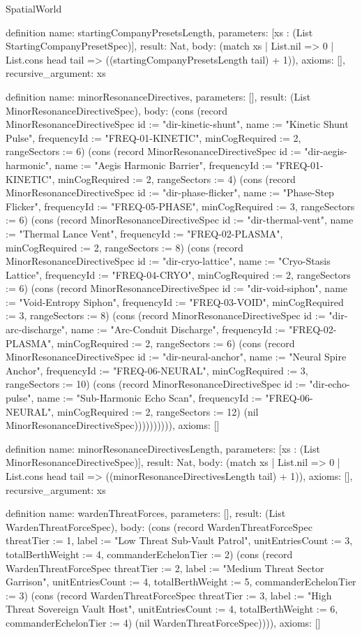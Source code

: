 \begin{lexlean}{SpatialWorld}
\begin{semanticmodule}
definition{
  name: startingCompanyPresetsLength,
  parameters: [xs : (List StartingCompanyPresetSpec)],
  result: Nat,
  body: (match xs
    | List.nil => 0
    | List.cons head tail => ((startingCompanyPresetsLength tail) + 1)),
  axioms: [],
  recursive_argument: xs
}

definition{
  name: minorResonanceDirectives,
  parameters: [],
  result: (List MinorResonanceDirectiveSpec),
  body: (cons (record MinorResonanceDirectiveSpec {id := "dir-kinetic-shunt", name := "Kinetic Shunt Pulse", frequencyId := "FREQ-01-KINETIC", minCogRequired := 2, rangeSectors := 6}) (cons (record MinorResonanceDirectiveSpec {id := "dir-aegis-harmonic", name := "Aegis Harmonic Barrier", frequencyId := "FREQ-01-KINETIC", minCogRequired := 2, rangeSectors := 4}) (cons (record MinorResonanceDirectiveSpec {id := "dir-phase-flicker", name := "Phase-Step Flicker", frequencyId := "FREQ-05-PHASE", minCogRequired := 3, rangeSectors := 6}) (cons (record MinorResonanceDirectiveSpec {id := "dir-thermal-vent", name := "Thermal Lance Vent", frequencyId := "FREQ-02-PLASMA", minCogRequired := 2, rangeSectors := 8}) (cons (record MinorResonanceDirectiveSpec {id := "dir-cryo-lattice", name := "Cryo-Stasis Lattice", frequencyId := "FREQ-04-CRYO", minCogRequired := 2, rangeSectors := 6}) (cons (record MinorResonanceDirectiveSpec {id := "dir-void-siphon", name := "Void-Entropy Siphon", frequencyId := "FREQ-03-VOID", minCogRequired := 3, rangeSectors := 8}) (cons (record MinorResonanceDirectiveSpec {id := "dir-arc-discharge", name := "Arc-Conduit Discharge", frequencyId := "FREQ-02-PLASMA", minCogRequired := 2, rangeSectors := 6}) (cons (record MinorResonanceDirectiveSpec {id := "dir-neural-anchor", name := "Neural Spire Anchor", frequencyId := "FREQ-06-NEURAL", minCogRequired := 3, rangeSectors := 10}) (cons (record MinorResonanceDirectiveSpec {id := "dir-echo-pulse", name := "Sub-Harmonic Echo Scan", frequencyId := "FREQ-06-NEURAL", minCogRequired := 2, rangeSectors := 12}) (nil MinorResonanceDirectiveSpec)))))))))),
  axioms: []
}

definition{
  name: minorResonanceDirectivesLength,
  parameters: [xs : (List MinorResonanceDirectiveSpec)],
  result: Nat,
  body: (match xs
    | List.nil => 0
    | List.cons head tail => ((minorResonanceDirectivesLength tail) + 1)),
  axioms: [],
  recursive_argument: xs
}

definition{
  name: wardenThreatForces,
  parameters: [],
  result: (List WardenThreatForceSpec),
  body: (cons (record WardenThreatForceSpec {threatTier := 1, label := "Low Threat Sub-Vault Patrol", unitEntriesCount := 3, totalBerthWeight := 4, commanderEchelonTier := 2}) (cons (record WardenThreatForceSpec {threatTier := 2, label := "Medium Threat Sector Garrison", unitEntriesCount := 4, totalBerthWeight := 5, commanderEchelonTier := 3}) (cons (record WardenThreatForceSpec {threatTier := 3, label := "High Threat Sovereign Vault Host", unitEntriesCount := 4, totalBerthWeight := 6, commanderEchelonTier := 4}) (nil WardenThreatForceSpec)))),
  axioms: []
}


\end{semanticmodule}
\end{lexlean}
